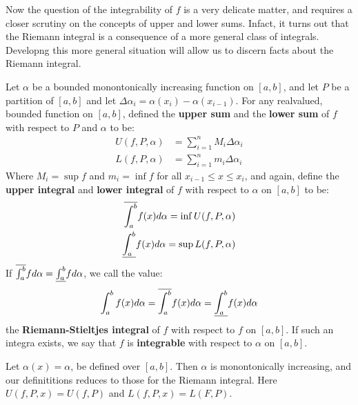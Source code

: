 Now the question of the integrability of $f$ is a very delicate matter, and
requires a closer scrutiny on the concepts of upper and lower sums. Infact, it
turns out that the Riemann integral is a consequence of a more general class of
integrals. Developng this more general situation will allow us to discern facts
about the Riemann integral.

\begin{definition}
    Let $\alpha$ be a bounded monontonically increasing function on  $[a,b]$,
    and let  $P$ be a partition of  $[a,b]$ and let
    $\Delta{\alpha_i}=\alpha(x_i)-\alpha(x_{i-1})$. For any realvalued, bounded
    function on  $[a,b]$, defined the \textbf{upper sum} and the \textbf{lower
    sum} of $f$ with respect to  $P$ and  $\alpha$ to be:
        \begin{align}
            U(f,P,\alpha) &= \sum_{i=1}^{n}{M_i\Delta{\alpha_i}} \\
            L(f,P,\alpha) &= \sum_{i=1}^{n}{m_i\Delta{\alpha_i}}
        \end{align}
        Where $M_i=\sup{f}$ and  $m_i=\inf{f}$ for all  $x_{i-1} \leq x \leq
        x_i$, and again, define the \textbf{upper integral} and  \textbf{lower
        integral} of $f$ with respect to  $\alpha$ on  $[a,b]$ to be:
            \begin{align}
                \overline{\int_{a}^{b}}{f(x)}d\alpha=\inf{U(f,P,\alpha)} \\
                \underline{\int_{a}^{b}}{f(x)}d\alpha=\sup{L(f,P,\alpha)}
            \end{align}
            If $\overline{\int_{a}^{b}}{f}d\alpha=\underline{\int_{a}^{b}}{f}d\alpha$, we
            call the value:
                \begin{equation}
                    \int_{a}^{b}{f(x)}d\alpha=\overline{\int_{a}^{b}}{f(x)}d\alpha=\underline{\int_{a}^{b}}{f(x)}d\alpha
                \end{equation}
            the \textbf{Riemann-Stieltjes integral} of $f$ with respect to  $f$
            on  $[a,b]$. If such an integra exists, we say that  $f$ is
            \textbf{integrable} with respect to  $\alpha$ on  $[a,b]$.
\end{definition}

\begin{example}
    Let $\alpha(x)=\alpha$, be defined over  $[a,b]$. Then  $\alpha$ is
    monontonically increasing, and our definititions reduces to those for the
    Riemann integral. Here  $U(f,P,x)=U(f,P)$ and  $L(f,P,x)=L(F,P)$.
\end{example}

